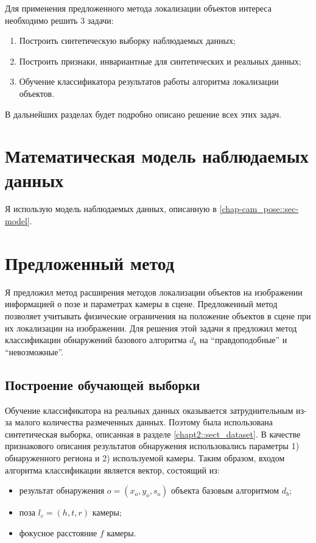 Для применения предложенного метода локализации объектов интереса необходимо решить 3 задачи:
\begin{enumerate}
	\item Построить синтетическую выборку наблюдаемых данных;
	\item Построить признаки, инвариантные для синтетических и реальных данных;
	\item Обучение классификатора результатов работы алгоритма локализации объектов.
\end{enumerate}
В дальнейших разделах будет подробно описано решение всех этих задач.

\section{Математическая модель наблюдаемых данных}

Я использую модель наблюдаемых данных, описанную в \ref{chap-cam_pose::sec-model}.

\section{Предложенный метод}

Я предложил метод расширения методов локализации объектов на изображении информацией о позе и параметрах камеры в сцене. Предложенный метод позволяет учитывать физические ограничения на положение объектов в сцене при их локализации на изображении. Для решения этой задачи я предложил метод классификации обнаружений базового алгоритма $d_b$ на ``правдоподобные'' и ``невозможные''.

\subsection{Построение обучающей выборки}

Обучение классификатора на реальных данных оказывается затруднительным из-за малого количества размеченных данных. Поэтому была использована синтетическая выборка, описанная в разделе \ref{chapt2::sect_dataset}. В качестве признакового описания результатов обнаружения использовались параметры 1) обнаруженного региона и 2) используемой камеры. Таким образом, входом алгоритма классификации является вектор, состоящий из:
\begin{itemize}
	\item результат обнаружения $o = (x_o, y_o, s_o)$ объекта базовым алгоритмом $d_b$;
	\item поза $l_c = (h, t, r)$ камеры;
	\item фокусное расстояние $f$ камеры.
\end{itemize}

